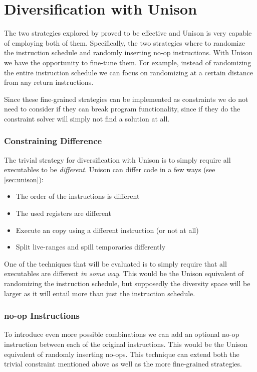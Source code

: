 \chapter{Diversification with Unison}

The two strategies explored by \textcite{large-scale-automated} proved to be
effective and Unison is very capable of employing both of them. Specifically, the two
strategies where to randomize the instruction schedule and randomly inserting no-op
instructions. With Unison we have the opportunity to fine-tune them. For example, instead
of randomizing the entire instruction schedule we can focus on randomizing at a certain
distance from any return instructions.

Since these fine-grained strategies can be implemented as constraints we do not need to
consider if they can break program functionality, since if they do the constraint solver
will simply not find a solution at all.

\subsection{Constraining Difference}

The trivial strategy for diversification with Unison is to simply require all executables
to be \textit{different}. Unison can differ code in a few ways (see \ref{sec:unison}):

\begin{itemize}
	\item The order of the instructions is different
	\item The used registers are different
	\item Execute an copy using a different instruction (or not at all)
	\item Split live-ranges and spill temporaries differently
\end{itemize}

One of the techniques that will be evaluated is to simply require that all executables
are different \textit{in some way}. This would be the Unison equivalent of randomizing
the instruction schedule, but supposedly the diversity space will be larger as it will
entail more than just the instruction schedule.

\subsection{no-op Instructions}

To introduce even more possible combinations we can add an optional no-op instruction
between each of the original instructions. This would be the Unison equivalent of randomly
inserting no-ops. This technique can extend both the trivial constraint mentioned above
as well as the more fine-grained strategies.

